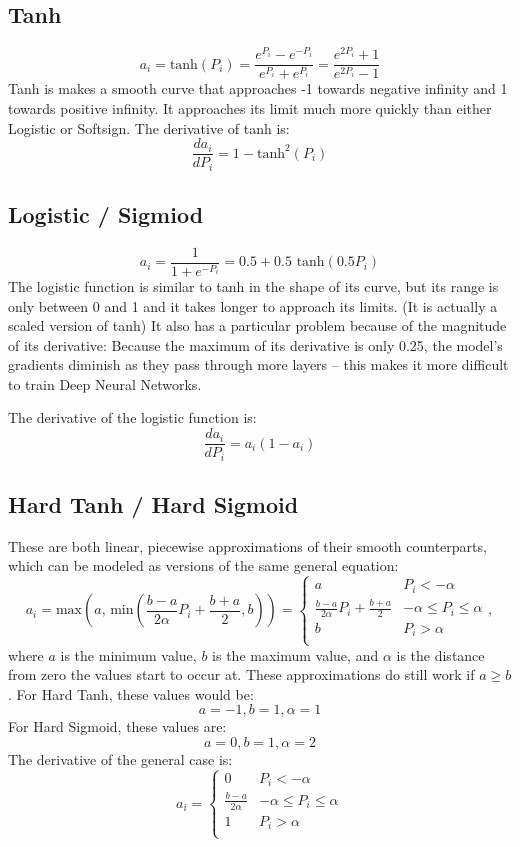 \documentclass[fleqn]{article}
\begin{document}
\subsection{Tanh}
\[ a_i = \text{tanh}(P_i) = \frac{e^{P_i} - e^{-P_i}}{e^{P_i} + e^{P_i}} =
\frac{e^{2P_i} +1}{e^{2P_i} -1} \]
Tanh is makes a smooth curve that approaches -1 towards negative infinity
and 1 towards positive infinity. It approaches its limit much more quickly
than either Logistic or Softsign.
The derivative of tanh is:
\[ \frac{d a_i}{d P_i} = 1 - \text{tanh}^2(P_i) \]

\subsection{Logistic / Sigmiod}
\[ a_i = \frac{1}{1 + e^{-P_i}} = 0.5 + 0.5 \text{ tanh}(0.5 P_i) \]
%
The logistic function is similar to tanh in the shape of its curve, but
its range is only between 0 and 1 and it takes longer to approach its
limits. (It is actually a scaled version of tanh) It also has a particular
problem because of the magnitude of its derivative: Because the maximum of
its derivative is only 0.25, the model's gradients diminish as they pass
through more layers -- this makes it more difficult to train Deep Neural
Networks.

The derivative of the logistic function is:
\[ \frac{d a_i}{d P_i} = a_i (1 - a_i) \]

\subsection{Hard Tanh / Hard Sigmoid}
These are both linear, piecewise approximations of their smooth
counterparts, which can be modeled as versions of the same general
equation:
\[ a_i = \text{max}(a, \, \text{min}(
\frac{b-a}{2 \alpha} P_i + \frac{b+a}{2}, b)) = \begin{cases}
	a & P_i < -\alpha \\
	\frac{b-a}{2 \alpha} P_i + \frac{b+a}{2} &
		-\alpha \leq P_i \leq \alpha \\
	b & P_i > \alpha \\
\end{cases}, \]
where $a$ is the minimum value, $b$ is the maximum value, and $\alpha$ is
the distance from zero the values start to occur at. These approximations
do still work if $a \geq b$.
 For Hard Tanh, these
values would be:
\[a=-1, b=1, \alpha=1\]
For Hard Sigmoid, these values are:
\[a=0, b=1, \alpha=2\]
The derivative of the general case is:
\[ a_i = \begin{cases}
	0 & P_i < -\alpha \\
	\frac{b-a}{2 \alpha} & -\alpha \leq P_i \leq \alpha \\
	1 & P_i > \alpha \\
\end{cases} \]
\end{document}
